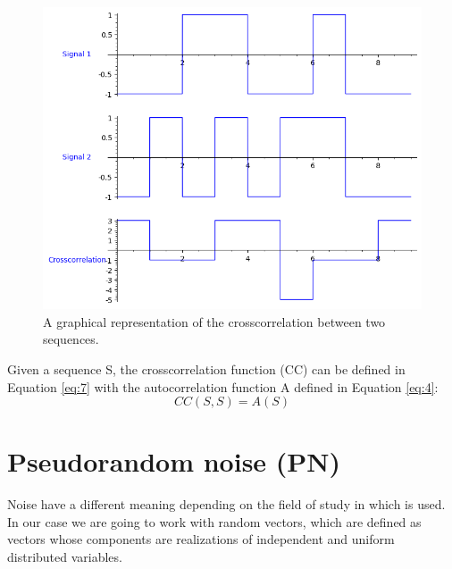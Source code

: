\begin{figure}[ht!] %
\begin{center}
\includegraphics[width=0.7\linewidth]{Chapters/Introduction/signals_crosscorrelation}
\end{center}
\caption{A graphical representation of the crosscorrelation between two sequences.}
\label{introduction_signals_crosscorrelation}
\end{figure}

\begin{definition}\label{lem:1}
  Given a sequence S, the crosscorrelation function  (CC) can be defined in Equation
  \eqref{eq:7} with the autocorrelation function A defined in Equation \eqref{eq:4}:
  \begin{equation}\label{eq:8}
    CC(S, S) = A(S)
  \end{equation}
\end{definition}












\section{Pseudorandom noise (PN)}

Noise have a different meaning depending on the field of study in which is
used. In our case we are going to work with random vectors,
which are defined as vectors whose components are realizations of independent
and uniform distributed variables\cite{white_noise}.\\

